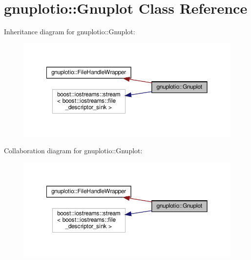 \hypertarget{classgnuplotio_1_1Gnuplot}{}\section{gnuplotio\+:\+:Gnuplot Class Reference}
\label{classgnuplotio_1_1Gnuplot}


Inheritance diagram for gnuplotio\+:\+:Gnuplot\+:\nopagebreak
\begin{figure}[H]
\begin{center}
\leavevmode
\includegraphics[width=350pt]{classgnuplotio_1_1Gnuplot__inherit__graph}
\end{center}
\end{figure}


Collaboration diagram for gnuplotio\+:\+:Gnuplot\+:\nopagebreak
\begin{figure}[H]
\begin{center}
\leavevmode
\includegraphics[width=350pt]{classgnuplotio_1_1Gnuplot__coll__graph}
\end{center}
\end{figure}
